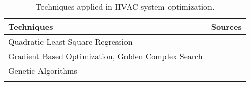 \begin{table}[ht]
\caption{Techniques applied in HVAC system optimization.}
\label{tab:Techniques}
\begin{tabular}{L{8cm} p{5cm}}
\toprule
Techniques 			&       Sources	 	\\
\midrule \midrule
Quadratic Least Square Regression                        & \cite{Ahn2001}                                                                                                                                                                                                                                                               \\
Gradient Based Optimization, Golden Complex Search       & \cite{Huh2008}\cite{Atthajariyakul2004}                                                                                                                                                                                                                                      \\
Genetic Algorithms                                       & \cite{LuLu2004}\cite{LuLu2005Part2}\cite{LuLu2005HVACSystemOptimization}\cite{Nassif2005}\cite{Wang2000Model-basedAlgorithm}\cite{XuXinhua2009}                                                                                                                              \\
                                                         & \cite{Mossolly-Ghali-Ghaddar_2009_Energy}\cite{Congradac2009HVACAlgorithms}\cite{Jin2005Prediction-basedSystems}\cite{WeiXiupeng2014ModelingAndOptimizationOfAChillerPlant}                                                                                                  \\

\end{tabular}
\end{table}
